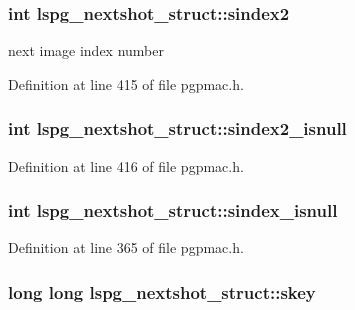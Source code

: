 \hypertarget{structlspg__nextshot__struct_ae9d0cfdff6868e0ba9cd5acafbe133db}{
\subsubsection[{sindex2}]{\setlength{\rightskip}{0pt plus 5cm}int lspg\-\_\-nextshot\-\_\-struct\-::sindex2}}\label{structlspg__nextshot__struct_ae9d0cfdff6868e0ba9cd5acafbe133db}


next image index number 



Definition at line 415 of file pgpmac.\-h.

\hypertarget{structlspg__nextshot__struct_a28e0b5c32a2741ef22edeb9d35b04e4d}{
\subsubsection[{sindex2\-\_\-isnull}]{\setlength{\rightskip}{0pt plus 5cm}int lspg\-\_\-nextshot\-\_\-struct\-::sindex2\-\_\-isnull}}\label{structlspg__nextshot__struct_a28e0b5c32a2741ef22edeb9d35b04e4d}


Definition at line 416 of file pgpmac.\-h.

\hypertarget{structlspg__nextshot__struct_a7ca4fbc86974d1b75a681ba5ecaaf5af}{
\subsubsection[{sindex\-\_\-isnull}]{\setlength{\rightskip}{0pt plus 5cm}int lspg\-\_\-nextshot\-\_\-struct\-::sindex\-\_\-isnull}}\label{structlspg__nextshot__struct_a7ca4fbc86974d1b75a681ba5ecaaf5af}


Definition at line 365 of file pgpmac.\-h.

\hypertarget{structlspg__nextshot__struct_af64a4e3f17752b5f1f05fb15d6f48382}{
\subsubsection[{skey}]{\setlength{\rightskip}{0pt plus 5cm}long long lspg\-\_\-nextshot\-\_\-struct\-::skey}}\label{structlspg__nextshot__struct_af64a4e3f17752b5f1f05fb15d6f48382}


